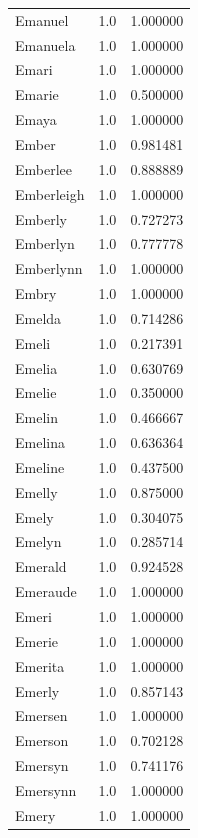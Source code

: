 \documentclass[
  letterpaper,
  DIV=11,
  numbers=noendperiod]{scrreprt}
\begin{document}
\begin{tabular}{lrr}
Emanuel         &   1.0 &   1.000000 \\
Emanuela        &   1.0 &   1.000000 \\
Emari           &   1.0 &   1.000000 \\
Emarie          &   1.0 &   0.500000 \\
Emaya           &   1.0 &   1.000000 \\
Ember           &   1.0 &   0.981481 \\
Emberlee        &   1.0 &   0.888889 \\
Emberleigh      &   1.0 &   1.000000 \\
Emberly         &   1.0 &   0.727273 \\
Emberlyn        &   1.0 &   0.777778 \\
Emberlynn       &   1.0 &   1.000000 \\
Embry           &   1.0 &   1.000000 \\
Emelda          &   1.0 &   0.714286 \\
Emeli           &   1.0 &   0.217391 \\
Emelia          &   1.0 &   0.630769 \\
Emelie          &   1.0 &   0.350000 \\
Emelin          &   1.0 &   0.466667 \\
Emelina         &   1.0 &   0.636364 \\
Emeline         &   1.0 &   0.437500 \\
Emelly          &   1.0 &   0.875000 \\
Emely           &   1.0 &   0.304075 \\
Emelyn          &   1.0 &   0.285714 \\
Emerald         &   1.0 &   0.924528 \\
Emeraude        &   1.0 &   1.000000 \\
Emeri           &   1.0 &   1.000000 \\
Emerie          &   1.0 &   1.000000 \\
Emerita         &   1.0 &   1.000000 \\
Emerly          &   1.0 &   0.857143 \\
Emersen         &   1.0 &   1.000000 \\
Emerson         &   1.0 &   0.702128 \\
Emersyn         &   1.0 &   0.741176 \\
Emersynn        &   1.0 &   1.000000 \\
Emery           &   1.0 &   1.000000 \\

\end{tabular}
\end{document}
